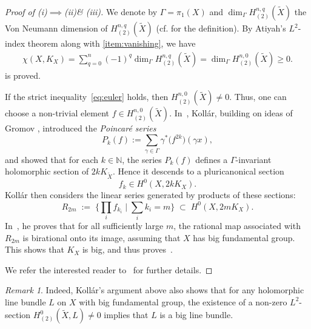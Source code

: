 \documentclass[english]{amsproc}
\theoremstyle{plain}
\newtheorem{conjecture}[thm]{Conjecture}
\theoremstyle{definition}
\theoremstyle{remark}
\newtheorem{rem}[thm]{Remark}
\theoremstyle{plain}
\numberwithin{equation}{thm} %
\newcommand{\bC}{\mathbb{C}}
\begin{document}
	\begin{proof}[Proof of (i)$\implies$(ii)\& (iii)]
		We denote by $\Gamma=\pi_1(X)$ and $\dim_{\Gamma}H^{n,q}_{(2)}(\widetilde{X})$ the Von Neumann dimension of $H^{n,q}_{(2)}(\widetilde{X})$ (cf. \cite{Ati76} for the definition). 
		By Atiyah's $L^2$-index theorem along with \cref{item:vanishing}, we have
		\begin{align} \label{eq:euler}	\chi(X,K_X)=\sum_{q=0}^{n}(-1)^q\dim_{\Gamma}H^{n,q}_{(2)}(\widetilde{X})= \dim_{\Gamma}H^{n,0}_{(2)}(\widetilde{X})\geq 0.
		\end{align} 
		 is proved. 
		
If the strict inequality~\eqref{eq:euler} holds, then $H^{n,0}_{(2)}(\widetilde{X}) \neq 0$. Thus, one can choose a non-trivial element $f \in H^{n,0}_{(2)}(\widetilde{X})$. In~\cite[Chapter~13]{Kol95}, Koll\'ar, building on ideas of Gromov \cite{Gro92}, introduced the \emph{Poincar\'e series}
\[
P_k(f) := \sum_{\gamma \in \Gamma} \gamma^*\!\big(f^{2k}\big)(\gamma x),
\]
and showed that for each $k \in \mathbb{N}$, the series $P_k(f)$ defines a $\Gamma$-invariant holomorphic section of $2kK_{\widetilde{X}}$. Hence it descends to a pluricanonical section
\[
f_k \in H^0(X, 2kK_X).
\]
 Koll\'ar then considers the linear series generated by products of these sections:
\[
R_{2m}
\;:=\;
\Big\{
\textstyle\prod_{i} f_{k_i}
\;\Big|\;
\sum_{i} k_i = m
\Big\}
\;\subset\; H^0(X, 2mK_X).
\]
In~\cite[Theorem~13.9]{Kol95}, he proves that for all sufficiently large $m$, the rational map associated with $R_{2m}$ is birational onto its image, assuming that $X$ has big fundamental group. This shows that $K_X$ is big, and thus proves~.

We refer the interested reader to~\cite[Chapter~13]{Kol95} for further details.
 \end{proof}
 \begin{rem}
 Indeed, Koll\'ar's argument above also shows that for any holomorphic line bundle $L$ on $X$ with big fundamental group, the existence of a non-zero $L^2$-section $H_{(2)}^0(\widetilde{X},L) \neq 0$ implies that $L$ is a big line bundle. 
 \end{rem}
\end{document}
